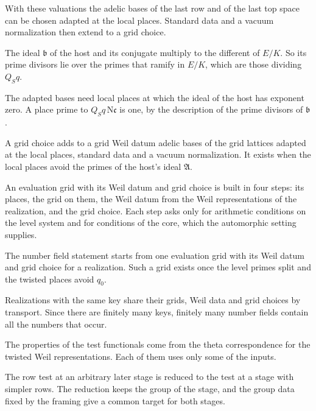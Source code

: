 With these valuations the adelic bases of the last row and of the last top space can be chosen adapted at the local
places. Standard data and a vacuum normalization then extend to a grid choice.

The ideal $\mathfrak b$ of the host and its conjugate multiply to the different of $E/K$. So its prime divisors lie
over the primes that ramify in $E/K$, which are those dividing $Q_Sq$.

The adapted bases need local places at which the ideal of the host has exponent zero. A place prime to
$Q_Sq\,\mathrm N\mathfrak c$ is one, by the description of the prime divisors of $\mathfrak b$.

A grid choice adds to a grid Weil datum adelic bases of the grid lattices adapted at the local places, standard data
and a vacuum normalization. It exists when the local places avoid the primes of the host's ideal $\mathfrak A$.

An evaluation grid with its Weil datum and grid choice is built in four steps: its places, the grid
on them, the Weil datum from the Weil representations of the realization, and the grid choice. Each
step asks only for arithmetic conditions on the level system and for conditions of the core, which
the automorphic setting supplies.

The number field statement starts from one evaluation grid with its Weil datum and grid choice for a
realization. Such a grid exists once the level primes split and the twisted places avoid $q_0$.

Realizations with the same key share their grids, Weil data and grid choices by transport. Since
there are finitely many keys, finitely many number fields contain all the numbers that occur.

The properties of the test functionals come from the theta correspondence for
the twisted Weil representations. Each of them uses only some of the inputs.

The row test at an arbitrary later stage is reduced to the test at a stage with
simpler rows. The reduction keeps the group of the stage, and the group data
fixed by the framing give a common target for both stages.

